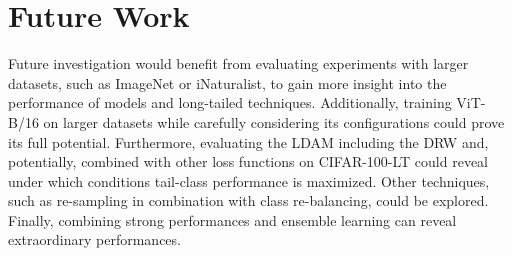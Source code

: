 \section{Future Work}
Future investigation would benefit from evaluating experiments with larger datasets, such as ImageNet or iNaturalist, to gain more insight into the performance of models and long-tailed techniques. Additionally, training ViT-B/16 on larger datasets while carefully considering its configurations could prove its full potential. Furthermore, evaluating the LDAM including the DRW and, potentially, combined with other loss functions on CIFAR-100-LT could reveal under which conditions tail-class performance is maximized. Other techniques, such as re-sampling in combination with class re-balancing, could be explored. Finally, combining strong performances and ensemble learning can reveal extraordinary performances.